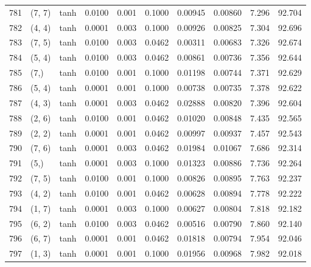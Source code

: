 \begin{tabular}{lllrrrrrrr}
781 &      (7, 7) &      tanh &  0.0100 &  0.001 &  0.1000 &          0.00945 &    0.00860 &       7.296 &    92.704 \\
782 &      (4, 4) &      tanh &  0.0001 &  0.003 &  0.1000 &          0.00926 &    0.00825 &       7.304 &    92.696 \\
783 &      (7, 5) &      tanh &  0.0100 &  0.003 &  0.0462 &          0.00311 &    0.00683 &       7.326 &    92.674 \\
784 &      (5, 4) &      tanh &  0.0100 &  0.003 &  0.0462 &          0.00861 &    0.00736 &       7.356 &    92.644 \\
785 &        (7,) &      tanh &  0.0100 &  0.001 &  0.1000 &          0.01198 &    0.00744 &       7.371 &    92.629 \\
786 &      (5, 4) &      tanh &  0.0001 &  0.001 &  0.1000 &          0.00738 &    0.00735 &       7.378 &    92.622 \\
787 &      (4, 3) &      tanh &  0.0001 &  0.003 &  0.0462 &          0.02888 &    0.00820 &       7.396 &    92.604 \\
788 &      (2, 6) &      tanh &  0.0100 &  0.001 &  0.0462 &          0.01020 &    0.00848 &       7.435 &    92.565 \\
789 &      (2, 2) &      tanh &  0.0001 &  0.001 &  0.0462 &          0.00997 &    0.00937 &       7.457 &    92.543 \\
790 &      (7, 6) &      tanh &  0.0001 &  0.003 &  0.0462 &          0.01984 &    0.01067 &       7.686 &    92.314 \\
791 &        (5,) &      tanh &  0.0001 &  0.003 &  0.1000 &          0.01323 &    0.00886 &       7.736 &    92.264 \\
792 &      (7, 5) &      tanh &  0.0100 &  0.001 &  0.1000 &          0.00826 &    0.00895 &       7.763 &    92.237 \\
793 &      (4, 2) &      tanh &  0.0100 &  0.001 &  0.0462 &          0.00628 &    0.00894 &       7.778 &    92.222 \\
794 &      (1, 7) &      tanh &  0.0001 &  0.003 &  0.1000 &          0.00627 &    0.00804 &       7.818 &    92.182 \\
795 &      (6, 2) &      tanh &  0.0100 &  0.003 &  0.0462 &          0.00516 &    0.00790 &       7.860 &    92.140 \\
796 &      (6, 7) &      tanh &  0.0001 &  0.001 &  0.0462 &          0.01818 &    0.00794 &       7.954 &    92.046 \\
797 &      (1, 3) &      tanh &  0.0001 &  0.001 &  0.1000 &          0.01956 &    0.00968 &       7.982 &    92.018 \\

\end{tabular}
